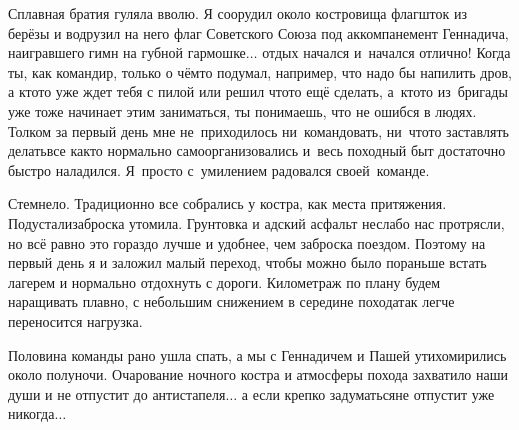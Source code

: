 Сплавная братия гуляла вволю. Я соорудил около костровища флагшток из берёзы и водрузил на него флаг Советского Союза под аккомпанемент Геннадича, наигравшего гимн на губной гармошке$\ldots$ отдых начался и~начался отлично! Когда ты, как командир, только о чём\sdash то подумал, например, что надо бы напилить дров, а кто\sdash то уже ждет тебя с пилой или решил что\sdash то ещё сделать, а~кто\sdash то из~бригады уже тоже начинает этим заниматься, ты понимаешь, что не ошибся в людях. Толком за первый день мне не~приходилось ни~командовать, ни~что\sdash то заставлять делать\mdash все как\sdash то нормально самоорганизовались и~весь походный быт достаточно быстро наладился. Я~просто с~умилением радовался своей~команде.

Стемнело. Традиционно все собрались у костра, как места притяжения. Подустали\mdash заброска утомила. Грунтовка и адский асфальт неслабо нас протрясли, но всё равно это гораздо лучше и удобнее, чем заброска поездом. Поэтому на первый день я и заложил малый переход, чтобы можно было пораньше встать лагерем и нормально отдохнуть с дороги. Километраж по плану будем наращивать плавно, с небольшим снижением в середине похода\mdash так легче переносится нагрузка.

Половина команды рано ушла спать, а мы с Геннадичем и Пашей утихомирились около полуночи. Очарование ночного костра и атмосферы похода захватило наши души и не отпустит до антистапеля$\ldots$ а если крепко задуматься\mdash не отпустит уже никогда$\ldots$

\begin{center}
\end{center}
